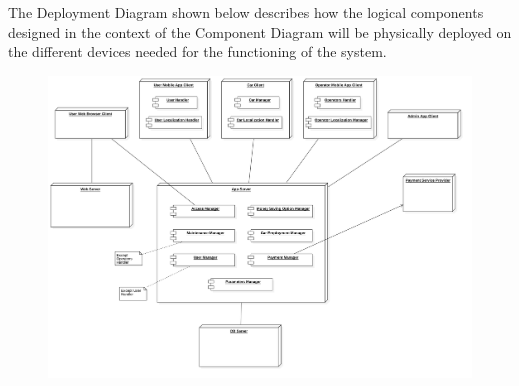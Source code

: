 The Deployment Diagram shown below describes how the logical components designed in the context of the Component Diagram will be physically deployed on the different devices needed for the functioning of the system.

\begin{landscape}
	\begin{figure}[p]
		\includegraphics[height=\vsize, center]{img/deployment_diagrams/global.png}
	\end{figure}
\end{landscape}
\FloatBarrier

